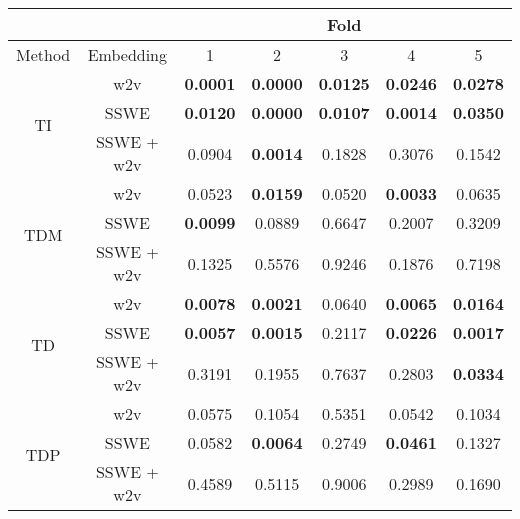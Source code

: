 \begin{tabular}{|c|c|c|c|c|c|c|}
\hline
  &       &  \multicolumn{5}{c|}{Fold} \\
\hline
 Method &   Embedding    &  1 &  2 &  3 &  4 &  5 \\
\hline
\multirow{3}{*}{TI} & w2v &  \textbf{0.0001} &  \textbf{0.0000} &  \textbf{0.0125} &  \textbf{0.0246} &  \textbf{0.0278} \\
& SSWE &  \textbf{0.0120} &  \textbf{0.0000} &  \textbf{0.0107} &  \textbf{0.0014} &  \textbf{0.0350} \\
& SSWE + w2v &  0.0904 &  \textbf{0.0014} &  0.1828 &  0.3076 &  0.1542 \\
\hline 
\multirow{3}{*}{TDM} & w2v &  0.0523 &  \textbf{0.0159} &  0.0520 &  \textbf{0.0033} &  0.0635 \\
& SSWE &  \textbf{0.0099} &  0.0889 &  0.6647 &  0.2007 &  0.3209 \\
& SSWE + w2v &  0.1325 &  0.5576 &  0.9246 &  0.1876 &  0.7198 \\
\hline 
\multirow{3}{*}{TD} & w2v &  \textbf{0.0078} &  \textbf{0.0021} &  0.0640 &  \textbf{0.0065} &  \textbf{0.0164} \\
& SSWE &  \textbf{0.0057} &  \textbf{0.0015} &  0.2117 &  \textbf{0.0226} &  \textbf{0.0017} \\
& SSWE + w2v &  0.3191 &  0.1955 &  0.7637 &  0.2803 &  \textbf{0.0334} \\
\hline 
\multirow{3}{*}{TDP} & w2v &  0.0575 &  0.1054 &  0.5351 &  0.0542 &  0.1034 \\
& SSWE &  0.0582 &  \textbf{0.0064} &  0.2749 &  \textbf{0.0461} &  0.1327 \\
& SSWE + w2v &  0.4589 &  0.5115 &  0.9006 &  0.2989 &  0.1690 \\
\hline 
\end{tabular}